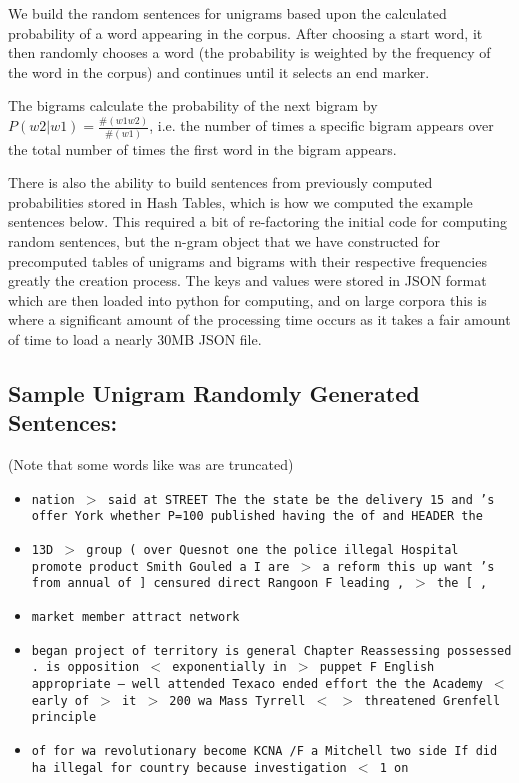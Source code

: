 \documentclass[12pt]{article}
\begin{document}
We build the random sentences for unigrams based upon the calculated probability of a word appearing in the corpus. After choosing a start word, it then randomly chooses a word (the probability is weighted by the frequency of the word in the corpus) and continues until it selects an end marker.

The bigrams calculate the probability of the next bigram by $P(w2|w1) = \frac{\#(w1 w2)}{\#(w1)}$, i.e. the number of times a specific bigram appears over the total number of times the first word in the bigram appears. 

There is also the ability to build sentences from previously computed probabilities stored in Hash Tables, which is how we computed the example sentences below. This required a bit of re-factoring the initial code for computing random sentences, but the n-gram object that we have constructed for precomputed tables of unigrams and bigrams with their respective frequencies greatly the creation process. The keys and values were stored in JSON format which are then loaded into python for computing, and on large corpora this is where a significant amount of the processing time occurs as it takes a fair amount of time to load a nearly 30MB JSON file. 

\subsection{Sample Unigram Randomly Generated Sentences:}
(Note that some words like was are truncated)

\begin{itemize}
\item \texttt{nation $>$ said at STREET The the state be the delivery 15 and 's offer York whether P=100 published having the of and HEADER the}

\item \texttt{13D $>$ group ( over Quesnot one the police illegal Hospital promote product Smith  Gouled a I are $>$ a reform this up want 's from annual of ] censured direct Rangoon F leading , $>$ the [ ,}

\item \texttt{market member attract network}

\item \texttt{began project of territory is general Chapter Reassessing possessed . is opposition $<$ exponentially in $>$ puppet F English appropriate -- well attended Texaco ended effort the the Academy $<$ early of $>$ it $>$ 200 wa Mass Tyrrell $<$ $>$ threatened Grenfell principle}

\item \texttt{of for wa revolutionary become KCNA /F a Mitchell two side If did ha illegal for country because investigation $<$ 1 on}
\end{itemize}
\end{document}

